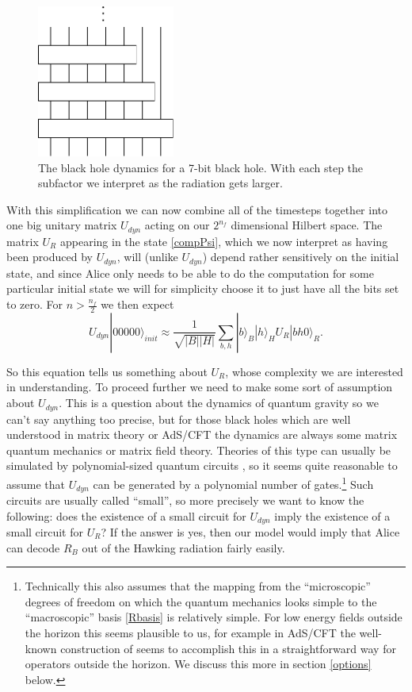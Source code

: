 \documentclass[12pt]{article}
\newcommand{\be}{\begin{equation}}
\newcommand{\ee}{\end{equation}}
\newcommand{\ran}{\rangle}
\begin{document}
\begin{figure}
\begin{center}
\includegraphics[height=5cm]{encoder.pdf}
\end{center}
\caption{The black hole dynamics for a 7-bit black hole.  With each step the subfactor we interpret as the radiation gets larger.}\label{encoder}
\end{figure} 
With this simplification we can now combine all of the timesteps together into one big unitary matrix $U_{dyn}$ acting on our $2^{n_f}$ dimensional Hilbert space.  The matrix $U_R$ appearing in the state \eqref{compPsi}, which we now interpret as having been produced by $U_{dyn}$, will (unlike $U_{dyn}$) depend rather sensitively on the initial state, and since Alice only needs to be able to do the computation for some particular initial state we will for simplicity choose it to just have all the bits set to zero.  For $n>\frac{n_f}{2}$ we then expect
\be
U_{dyn}|00000\ran_{init}\approx\frac{1}{\sqrt{|B||H|}}\sum_{b,h}|b\ran_B|h\ran_HU_R|bh0\ran_R.
\ee

So this equation tells us something about $U_R$, whose complexity we are interested in understanding.  To proceed further we need to make some sort of assumption about $U_{dyn}$.  This is a question about the dynamics of quantum gravity so we can't say anything too precise, but for those black holes which are well understood in matrix theory \cite{Banks:1996vh} or AdS/CFT \cite{Maldacena:1997re,Witten:1998qj,Maldacena:2001kr} the dynamics are always some matrix quantum mechanics or matrix field theory.  Theories of this type can usually be simulated by polynomial-sized quantum circuits \cite{feynman1982simulating,lloyd1996universal,Abrams:1997gk,Jordan:2011ne}, so it seems quite reasonable to assume that $U_{dyn}$ can be generated by a polynomial number of gates.\footnote{Technically this also assumes that the mapping from the ``microscopic'' degrees of freedom on which the quantum mechanics looks simple to the ``macroscopic'' basis \eqref{Rbasis} is relatively simple.  For low energy fields outside the horizon this seems plausible to us, for example in AdS/CFT the well-known construction of \cite{Kabat:2011rz} seems to accomplish this in a straightforward way for operators outside the horizon.  We discuss this more in section \eqref{options} below.}  Such circuits are usually called ``small'', so more precisely we want to know the following: does the existence of a small circuit for $U_{dyn}$ imply the existence of a small circuit for $U_R$?  If the answer is yes, then our model would imply that Alice can decode $R_B$ out of the Hawking radiation fairly easily.  
\end{document}
